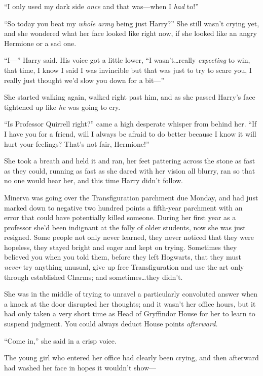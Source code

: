 “I only used my dark side \emph{once} and that was—when I \emph{had} to!”

“So today you beat my \emph{whole army} being just Harry?” She still wasn’t crying yet, and she wondered what her face looked like right now, if she looked like an angry Hermione or a sad one.

“I—” Harry said. His voice got a little lower, “I wasn’t…really \emph{expecting} to win, that time, I know I said I was invincible but that was just to try to scare you, I really just thought we’d slow you down for a bit—”

She started walking again, walked right past him, and as she passed Harry’s face tightened up like \emph{he} was going to cry.

“Is Professor Quirrell right?” came a high desperate whisper from behind her. “If I have you for a friend, will I always be afraid to do better because I know it will hurt your feelings? That’s not fair, Hermione!”

She took a breath and held it and ran, her feet pattering across the stone as fast as they could, running as fast as she dared with her vision all blurry, ran so that no one would hear her, and this time Harry didn’t follow.

\later

Minerva was going over the Transfiguration parchment due Monday, and had just marked down to negative two hundred points a fifth-year parchment with an error that could have potentially killed someone. During her first year as a professor she’d been indignant at the folly of older students, now she was just resigned. Some people not only never learned, they never noticed that they were hopeless, they stayed bright and eager and kept on trying. Sometimes they believed you when you told them, before they left Hogwarts, that they must \emph{never} try anything unusual, give up free Transfiguration and use the art only through established Charms; and sometimes…they didn’t.

She was in the middle of trying to unravel a particularly convoluted answer when a knock at the door disrupted her thoughts; and it wasn’t her office hours, but it had only taken a very short time as Head of Gryffindor House for her to learn to suspend judgment. You could always deduct House points \emph{afterward.}

“Come in,” she said in a crisp voice.

The young girl who entered her office had clearly been crying, and then afterward had washed her face in hopes it wouldn’t show—

